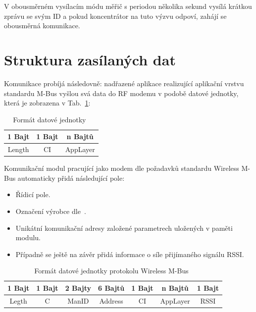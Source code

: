  V obousměrném vysílacím módu měřič s periodou několika sekund vysílá krátkou zprávu se svým ID a pokud koncentrátor na tuto výzvu odpoví, zahájí se obousměrná komunikace.




\section{Struktura zasílaných dat}
Komunikace probíjá následovně: nadřazené aplikace realizující aplikační vrstvu standardu M-Bus vyšlou svá data do RF modemu v podobě datové jednotky, která je zobrazena v Tab.~\ref{PaketWm1}:

\begin{table}[!h]
\centering
\begin{tabular}{ccc}
1 Bajt & 1 Bajt & n Bajtů \\ \hline
\multicolumn{1}{|c|}{Length} & \multicolumn{1}{c|}{CI} & \multicolumn{1}{c|}{AppLayer} \\ \hline
\end{tabular}
\caption{Formát datové jednotky~\cite{FormatDatoveJednotky}}
\label{PaketWm1}
\end{table}

Komunikační modul pracující jako modem dle požadavků standardu Wireless M-Bus automaticky přidá následující pole:

\begin{itemize}
	\item Řídicí pole.
\item Označení výrobce dle~\cite{WmbusVendors}.
\item Unikátní komunikační adresy založené parametrech uložených v paměti modulu.
\item Případně se ještě na závěr přidá informace o síle přijímaného signálu RSSI.
\end{itemize}



\begin{table}[!h]
\centering
\begin{tabular}{ccccccc}
1 Bajt & 1 Bajt & 2 Bajty & 6 Bajtů & 1 Bajt & n Bajtů & 1 Bajt \\ \hline
\multicolumn{1}{|c|}{Legth} & \multicolumn{1}{c|}{C} & \multicolumn{1}{c|}{ManID} & \multicolumn{1}{c|}{Address} & \multicolumn{1}{c|}{CI} & \multicolumn{1}{c|}{AppLayer} & \multicolumn{1}{c|}{RSSI} \\ \hline
\end{tabular}
\caption{Formát datové jednotky protokolu Wireless M-Bus~\cite{FormatDatoveJednotky}}
\label{PaketWm2}
\end{table}

